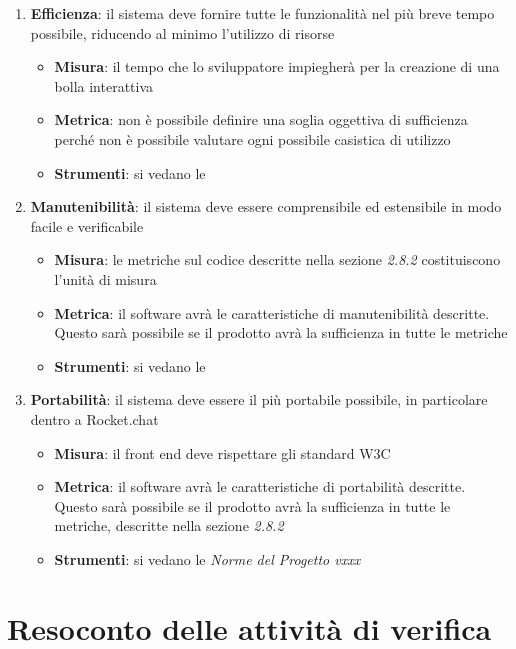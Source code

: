 {\begin{enumerate}
  \item \textbf{Efficienza}: il sistema deve fornire tutte le funzionalità nel più breve tempo possibile,
    riducendo al minimo l’utilizzo di risorse
    \begin{itemize}
    \item \textbf{Misura}: il tempo che lo sviluppatore impiegherà per la creazione di una bolla interattiva
    \item \textbf{Metrica}: non è possibile definire una soglia oggettiva di sufficienza perché non è possibile valutare ogni possibile casistica di utilizzo
    \item \textbf{Strumenti}: si vedano le  \emph{\normediprogetto}
    \end{itemize}

  \item \textbf{Manutenibilità}: il sistema deve essere comprensibile ed estensibile in modo facile e verificabile
    \begin{itemize}
    \item \textbf{Misura}: le metriche sul codice descritte nella sezione \emph{2.8.2}
      costituiscono l'unità di misura
    \item \textbf{Metrica}: il software avrà le caratteristiche di manutenibilità descritte. Questo sarà possibile se il prodotto avrà la sufficienza in tutte le metriche
    \item \textbf{Strumenti}: si vedano le  \emph{\normediprogetto}
    \end{itemize}

  \item \textbf{Portabilità}: il sistema deve essere il più portabile possibile, in particolare dentro a Rocket.chat
    \begin{itemize}
    \item \textbf{Misura}: il front end deve rispettare gli standard W3C
    \item \textbf{Metrica}: il software avrà le caratteristiche di
      portabilità descritte. Questo sarà possibile se il prodotto
      avrà la sufficienza in tutte le metriche, descritte nella sezione \emph{2.8.2}
    \item \textbf{Strumenti}: si vedano le \emph{Norme del Progetto vxxx}
    \end{itemize}
  \end{enumerate}




  \section{Resoconto delle attività di verifica}

}
